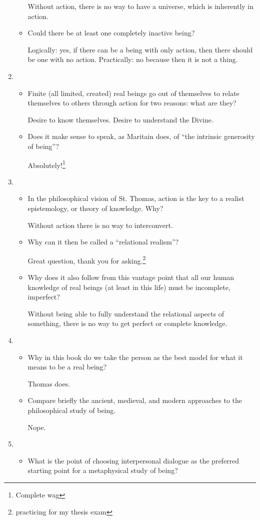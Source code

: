 \documentclass[12pt]{article}[titlepage]
\newcommand{\say}[1]{``#1''}
\newcommand{\1}{\={a}}
\newcommand{\2}{\={e}}
\newcommand{\3}{\={\i}}
\newcommand{\4}{\=o}
\newcommand{\5}{\=u}
\newcommand{\6}{\={A}}
\renewcommand{\,}{\textsuperscript{,}}
\begin{document}
\begin{enumerate}
\begin{itemize}
Without action, there is no way to have a universe, which is inherently in action.
\item Could there be at least one completely inactive being?

Logically: yes, if there can be a being with only action, then there should be one with no action.
Practically: no because then it is not a thing.
\end{itemize}
\item \begin{itemize}
\item Finite (all limited, created) real beings go out of themselves to relate themselves to others through action for two reasons: what are they?

Desire to know themselves.
Desire to understand the Divine.
\item Does it make sense to speak, as Maritain does, of \say{the intrinsic generosity of being}?

Absolutely!\footnote{Complete wag}
\end{itemize}
\item \begin{itemize}
\item In the philosophical vision of St. Thomas, action is the key to a realist epistemology, or theory of knowledge.
Why?

Without action there is no way to interconvert.
\item Why can it then be called a \say{relational realism}?

Great question, thank you for asking.\footnote{practicing for my thesis exam}
\item Why does it also follow from this vantage point that all our human knowledge of real beings (at least in this life) must be incomplete, imperfect?

Without being able to fully understand the relational aspects of something, there is no way to get perfect or complete knowledge.
\end{itemize}
\item \begin{itemize}
\item Why in this book do we take the person as the best model for what it means to be a real being?

Thomas does.
\item Compare briefly the ancient, medieval, and modern approaches to the philosophical study of being.

Nope.
\end{itemize}
\item \begin{itemize}
\item What is the point of choosing interpersonal dialogue as the preferred starting point for a metaphysical study of being?


\end{itemize}
\end{enumerate}
\end{document}
